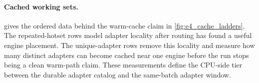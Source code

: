\begin{table}[H]
\centering
\scriptsize
\setlength{\tabcolsep}{4pt}
\renewcommand{\arraystretch}{1.06}
\caption{Adapter catalog sweep for $N=64$ serving. Warm and cold rows are split so the stable regime gap is visible at each catalog size.}
\label{tab:app_path_pool_sweep}
\end{table}

\paragraph{Cached working sets.}
 gives the ordered data behind the warm-cache claim in \cref{fig:e4_cache_ladders}. The repeated-hotset rows model adapter locality after routing has found a useful engine placement. The unique-adapter rows remove this locality and measure how many distinct adapters can become cached near one engine before the run stops being a clean warm-path claim. These measurements define the CPU-side tier between the durable adapter catalog and the same-batch adapter window.

